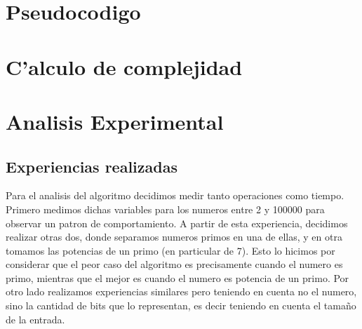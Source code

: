 \section{Pseudocodigo}


\section{C'alculo de complejidad}

\section{Analisis Experimental}
\subsection{Experiencias realizadas}
Para el analisis del algoritmo decidimos medir tanto operaciones como tiempo. Primero medimos dichas variables para los numeros entre 2 y 100000 para observar un patron de comportamiento. A partir de esta experiencia, decidimos realizar otras dos, donde separamos numeros primos en una de ellas, y en otra tomamos las potencias de un primo (en particular de 7). Esto lo hicimos por considerar que el peor caso del algoritmo es precisamente cuando el numero es primo, mientras que el mejor es cuando el numero es potencia de un primo. Por otro lado realizamos experiencias similares pero teniendo en cuenta no el numero, sino la cantidad de bits que lo representan, es decir teniendo en cuenta el tama\~{n}o de la entrada.
